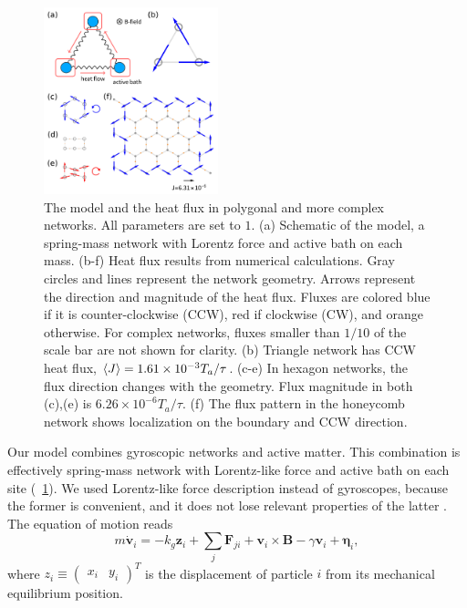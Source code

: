 \documentclass[
 preprint,
 preprintnumbers,
 amsmath,amssymb,
 aps,
 pre,
 longbibliography,
 10pt, twocolumn
]{revtex4-1}
\begin{document}
\begin{figure}[ht]
	\centering
	\includegraphics[width=0.45\textwidth]{1_model_and_result.pdf}
    \caption{The model and the heat flux in polygonal and more complex networks. All parameters are set to $1$. 
    (a) Schematic of the model, a spring-mass network with Lorentz force and active bath on each mass. 
    (b-f) Heat flux results from numerical calculations. Gray circles and lines represent the network geometry. Arrows represent the direction and magnitude of the heat flux. Fluxes are colored blue if it is counter-clockwise (CCW), red if clockwise (CW), and orange otherwise. For complex networks, fluxes smaller than $1/10$ of the scale bar are not shown for clarity. 
    (b) Triangle network has CCW heat flux, $\expval{J}=1.61\times 10^{-3} T_a/\tau$.  
    (c-e) In hexagon networks, the flux direction changes with the geometry. Flux magnitude in both (c),(e) is $6.26\times 10^{-6} T_a/\tau$. 
    (f) The flux pattern in the honeycomb network shows localization on the boundary and CCW direction.
    }
    \label{fig:model_and_result}
\end{figure}

Our model combines gyroscopic networks and active matter. This combination is effectively spring-mass network with Lorentz-like force and active bath on each site (\figurename~\ref{fig:model_and_result}).
We used Lorentz-like force description instead of gyroscopes, because the former is convenient, and it does not lose relevant properties of the latter \cite{Lee2018TopologicalLaws}.
The equation of motion reads
\begin{equation} \label{eqn:GLE_single}
    m\dot{\bm{v}}_i = -k_g \bm{z}_i + \sum_j\bm{F}_{ji} + \bm{v}_i\times\bm{B} - \gamma\bm{v}_i + \bm{\eta}_i ,
\end{equation}
where $z_i \equiv \begin{pmatrix} x_i & y_i \end{pmatrix}^T$ is the displacement of particle $i$ from its mechanical equilibrium position.
\end{document}
